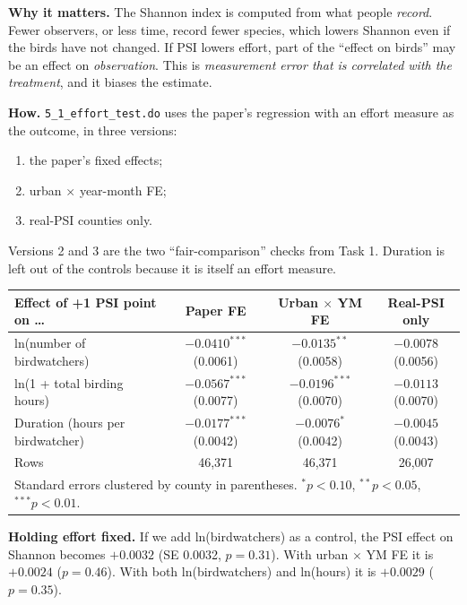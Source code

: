 \documentclass[11pt]{article}
\begin{document}
\textbf{Why it matters.} The Shannon index is computed from what people \emph{record}. Fewer observers, or less time, record fewer species, which lowers Shannon even if the birds have not changed. If PSI lowers effort, part of the ``effect on birds'' may be an effect on \emph{observation}. This is \emph{measurement error that is correlated with the treatment}, and it biases the estimate.

\textbf{How.} \texttt{5\_1\_effort\_test.do} uses the paper's regression with an effort measure as the outcome, in three versions:
\begin{enumerate}[leftmargin=18pt,itemsep=1pt]
\item the paper's fixed effects;
\item urban $\times$ year-month FE;
\item real-PSI counties only.
\end{enumerate}
Versions 2 and 3 are the two ``fair-comparison'' checks from Task 1. Duration is left out of the controls because it is itself an effort measure.

\begin{center}
\small
\begin{tabular}{l ccc}
\toprule
Effect of +1 PSI point on \ldots & Paper FE & Urban $\times$ YM FE & Real-PSI only \\
\midrule
ln(number of birdwatchers) & $-0.0410^{***}$ (0.0061) & $-0.0135^{**}$ (0.0058) & $-0.0078$ (0.0056) \\
ln(1 + total birding hours) & $-0.0567^{***}$ (0.0077) & $-0.0196^{***}$ (0.0070) & $-0.0113$ (0.0070) \\
Duration (hours per birdwatcher) & $-0.0177^{***}$ (0.0042) & $-0.0076^{*}$ (0.0042) & $-0.0045$ (0.0043) \\
\midrule
Rows & 46,371 & 46,371 & 26,007 \\
\bottomrule
\multicolumn{4}{l}{\footnotesize Standard errors clustered by county in parentheses. $^{*}p<0.10$, $^{**}p<0.05$, $^{***}p<0.01$.}
\end{tabular}
\end{center}

\textbf{Holding effort fixed.} If we add ln(birdwatchers) as a control, the PSI effect on Shannon becomes $+0.0032$ (SE 0.0032, $p=0.31$). With urban $\times$ YM FE it is $+0.0024$ ($p=0.46$). With both ln(birdwatchers) and ln(hours) it is $+0.0029$ ($p=0.35$).
\end{document}
